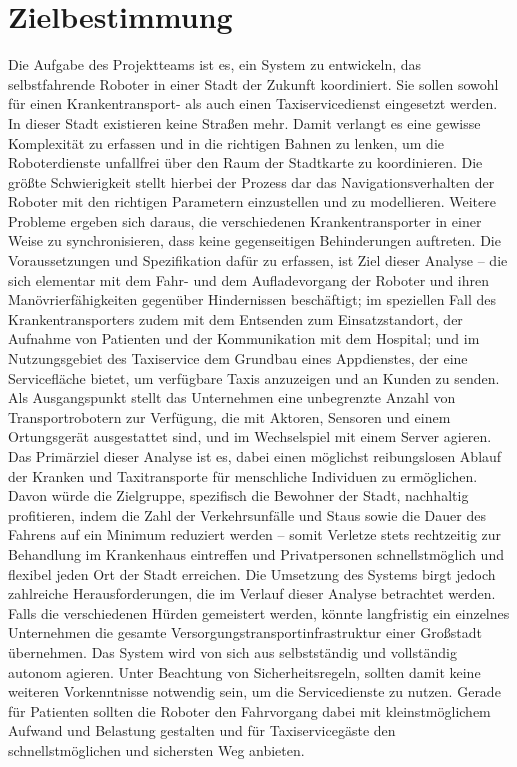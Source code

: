 
\section{Zielbestimmung}
Die Aufgabe des Projektteams ist es, ein System zu entwickeln, das selbstfahrende Roboter in einer Stadt der Zukunft koordiniert. Sie sollen sowohl für einen Krankentransport- als auch einen Taxiservicedienst eingesetzt werden. 
In dieser Stadt existieren keine Straßen mehr. Damit verlangt es eine gewisse Komplexität zu erfassen und in die richtigen Bahnen zu lenken, um die Roboterdienste unfallfrei über den Raum der Stadtkarte zu koordinieren. Die größte Schwierigkeit stellt hierbei der Prozess dar das Navigationsverhalten der Roboter mit den richtigen Parametern einzustellen und zu modellieren. Weitere Probleme ergeben sich daraus, die verschiedenen Krankentransporter in einer Weise zu synchronisieren, dass keine gegenseitigen Behinderungen auftreten. 
Die Voraussetzungen und Spezifikation dafür zu erfassen, ist Ziel dieser Analyse – die sich elementar mit dem Fahr- und dem Aufladevorgang der Roboter und ihren Manövrierfähigkeiten gegenüber Hindernissen beschäftigt; im speziellen Fall des Krankentransporters zudem mit dem Entsenden zum Einsatzstandort, der Aufnahme von Patienten und der Kommunikation mit dem Hospital; und im Nutzungsgebiet des Taxiservice dem Grundbau eines Appdienstes, der eine Servicefläche bietet, um verfügbare Taxis anzuzeigen und an Kunden zu senden. \\

Als Ausgangspunkt stellt das Unternehmen eine unbegrenzte Anzahl von Transportrobotern zur Verfügung, die mit Aktoren, Sensoren und einem Ortungsgerät ausgestattet sind, und im Wechselspiel mit einem Server agieren. \\

Das Primärziel dieser Analyse ist es, dabei einen möglichst reibungslosen Ablauf der Kranken und Taxitransporte für menschliche Individuen zu ermöglichen. Davon würde die Zielgruppe, spezifisch die Bewohner der Stadt, nachhaltig profitieren, indem die Zahl der Verkehrsunfälle und Staus sowie die Dauer des Fahrens auf ein Minimum reduziert werden – somit Verletze stets rechtzeitig zur Behandlung im Krankenhaus eintreffen und Privatpersonen schnellstmöglich und flexibel jeden Ort der Stadt erreichen. Die Umsetzung des Systems birgt jedoch zahlreiche Herausforderungen, die im Verlauf dieser Analyse betrachtet werden. Falls die verschiedenen Hürden gemeistert werden, könnte langfristig ein einzelnes Unternehmen die gesamte Versorgungstransportinfrastruktur einer Großstadt übernehmen. Das System wird von sich aus selbstständig und vollständig autonom agieren. Unter Beachtung von Sicherheitsregeln, sollten damit keine weiteren Vorkenntnisse notwendig sein, um die Servicedienste zu nutzen. Gerade für Patienten sollten die Roboter den Fahrvorgang dabei mit kleinstmöglichem Aufwand und Belastung gestalten und für Taxiservicegäste den schnellstmöglichen und sichersten Weg anbieten. \\

\pagebreak
